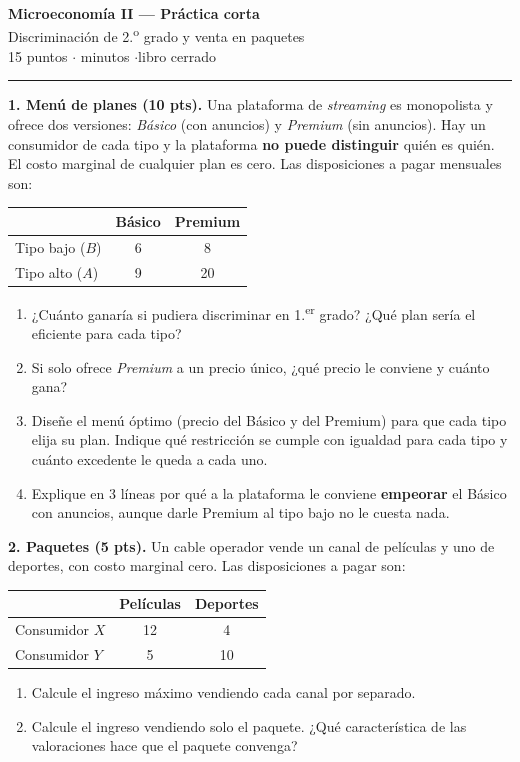 \documentclass[11pt]{article}
\begin{document}
\begin{center}
{\Large\bfseries Microeconomía II --- Práctica corta}\\[4pt]
{\large Discriminación de 2.\textsuperscript{o} grado y venta en paquetes}\\[4pt]
15 puntos \quad$\cdot$ minutos \quad$\cdot$\quad libro cerrado
\end{center}

\hrule
\medskip

\textbf{1. Menú de planes (10 pts).} Una plataforma de \textit{streaming} es monopolista y ofrece dos versiones: \textit{Básico} (con anuncios) y \textit{Premium} (sin anuncios). Hay un consumidor de cada tipo y la plataforma \textbf{no puede distinguir} quién es quién. El costo marginal de cualquier plan es cero. Las disposiciones a pagar mensuales son:

\begin{center}
\begin{tabular}{lcc}
\toprule
 & Básico & Premium \\
\midrule
Tipo bajo ($B$) & 6 & 8 \\
Tipo alto ($A$) & 9 & 20 \\
\bottomrule
\end{tabular}
\end{center}

\begin{enumerate}[label=\alph*), leftmargin=*, itemsep=6pt]
\item ¿Cuánto ganaría si pudiera discriminar en 1.\textsuperscript{er} grado? ¿Qué plan sería el eficiente para cada tipo?
\item Si solo ofrece \textit{Premium} a un precio único, ¿qué precio le conviene y cuánto gana?
\item Diseñe el menú óptimo (precio del Básico y del Premium) para que cada tipo elija su plan. Indique qué restricción se cumple con igualdad para cada tipo y cuánto excedente le queda a cada uno.
\item Explique en 3 líneas por qué a la plataforma le conviene \textbf{empeorar} el Básico con anuncios, aunque darle Premium al tipo bajo no le cuesta nada.
\end{enumerate}

\textbf{2. Paquetes (5 pts).} Un cable operador vende un canal de películas y uno de deportes, con costo marginal cero. Las disposiciones a pagar son:

\begin{center}
\begin{tabular}{lcc}
\toprule
 & Películas & Deportes \\
\midrule
Consumidor $X$ & 12 & 4 \\
Consumidor $Y$ & 5 & 10 \\
\bottomrule
\end{tabular}
\end{center}

\begin{enumerate}[label=\alph*), leftmargin=*, itemsep=6pt]
\item Calcule el ingreso máximo vendiendo cada canal por separado.
\item Calcule el ingreso vendiendo solo el paquete. ¿Qué característica de las valoraciones hace que el paquete convenga?
\end{enumerate}
\end{document}

